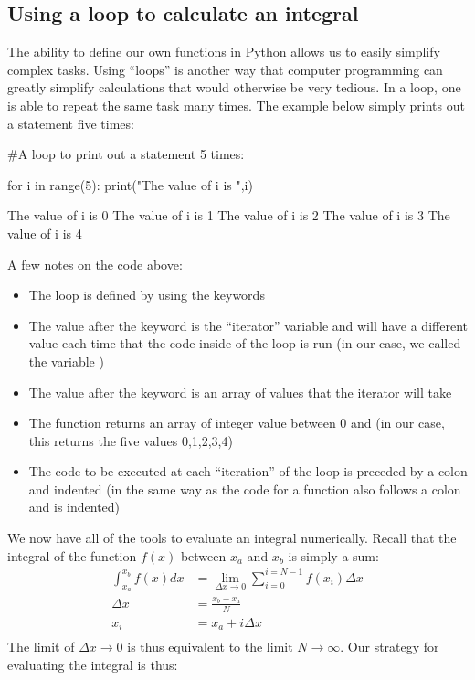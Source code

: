 \subsection{Using a loop to calculate an integral}
The ability to define our own functions in Python allows us to easily simplify complex tasks. Using ``loops'' is another way that computer programming can greatly simplify calculations that would otherwise be very tedious. In a loop, one is able to repeat the same task many times. The example below simply prints out a statement five times:
\begin{python}[caption=A simple loop] 
#A loop to print out a statement 5 times:

for i in range(5):
  print("The value of i is ",i)
\end{python}
\begin{poutput}
The value of i is  0
The value of i is  1
The value of i is  2
The value of i is  3
The value of i is  4
\end{poutput}
A few notes on the code above:
\begin{itemize}
\item The loop is defined by using the keywords 
\item The value after the keyword  is the ``iterator'' variable and will have a different value each time that the code inside of the loop is run (in our case, we called the variable )
\item The value after the keyword  is an array of values that the iterator will take
\item The  function returns an array of  integer value between 0 and  (in our case, this returns the five values 0,1,2,3,4)
\item The code to be executed at each ``iteration'' of the loop is preceded by a colon and indented (in the same way as the code for a function also follows a colon and is indented)
\end{itemize}
We now have all of the tools to evaluate an integral numerically. Recall that the integral of the function $f(x)$ between $x_a$ and $x_b$ is simply a sum:
\begin{align*}
\int_{x_a}^{x_b} f(x) dx&=\lim_{\Delta x \to 0} \sum_{i=0}^{i=N-1} f(x_{i})\Delta x\\
\Delta x &= \frac{x_b-x_a}{N}\\
x_i&=x_a+i\Delta x\\
\end{align*}
The limit of $\Delta x \to 0$ is thus equivalent to the limit $N \to \infty$. Our strategy for evaluating the integral is thus:
